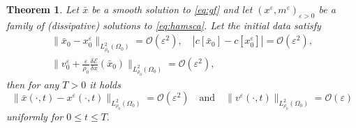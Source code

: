 \documentclass[10pt, letterpaper]{article}
\def\E{{\mathcal{E}}}
\def\bx{\bar{x}}
\def\eps{\varepsilon}
\newtheorem{theorem}{Theorem}
\theoremstyle{definition}
\theoremstyle{remark}
\begin{document}
\begin{theorem}
 Let $\bx$ be a smooth solution to \eqref{eq:gf} and let $(x^\eps,m^\eps)_{\eps>0}$ be a family of (dissipative) solutions to \eqref{eq:hamsca}.
 Let the initial data satisfy 
 \begin{equation}
 \label{eq:condini}
 \begin{split}
   \| \bx_0 - x_0^\eps\|_{L^2_{\rho_0}(\Omega_0)} = \mathcal{O}(\eps^2), \quad | c[\bx_0] - c[x_0^\eps] | = \mathcal{O}(\eps^2),\\
  \Big\|v_0^\eps + \frac{\eps}{\rho_0} \frac{\delta \E}{\delta x}(\bx_0)\Big\|_{L^2_{\rho_0}(\Omega_0)} =\mathcal{O}(\eps^2), %
   \end{split}
 \end{equation}
 then for any $T>0$ it holds
 \[ \| \bx(\cdot,t) - x^\eps(\cdot,t) \|_{L^2_{\rho_0}(\Omega_0)}=\mathcal{O}(\eps^2) \quad \text{and} \quad  \| v^\eps(\cdot,t) \|_{L^2_{\rho_0}(\Omega_0)}=\mathcal{O}(\eps)\]
 uniformly for $0 \leq t \leq T.$
\end{theorem}
\end{document}
